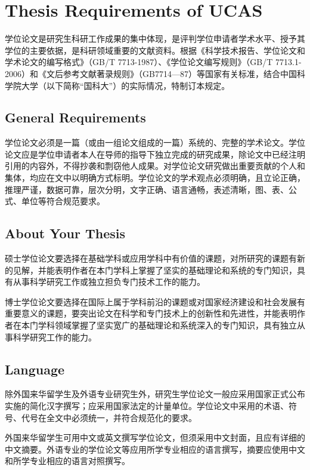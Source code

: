 
\chapter{Thesis Requirements of UCAS}
学位论文是研究生科研工作成果的集中体现，是评判学位申请者学术水平、授予其学位的主要依据，是科研领域重要的文献资料。根据《科学技术报告、学位论文和学术论文的编写格式》（GB/T 7713-1987）、《学位论文编写规则》（GB/T 7713.1-2006）和《文后参考文献著录规则》（GB7714—87）等国家有关标准，结合中国科学院大学（以下简称“国科大”）的实际情况，特制订本规定。

\section{General Requirements}

学位论文必须是一篇（或由一组论文组成的一篇）系统的、完整的学术论文。学位论文应是学位申请者本人在导师的指导下独立完成的研究成果，除论文中已经注明引用的内容外，不得抄袭和剽窃他人成果。对学位论文研究做出重要贡献的个人和集体，均应在文中以明确方式标明。学位论文的学术观点必须明确，且立论正确，推理严谨，数据可靠，层次分明，文字正确、语言通畅，表述清晰，图、表、公式、单位等符合规范要求。

\section{About Your Thesis}

硕士学位论文要选择在基础学科或应用学科中有价值的课题，对所研究的课题有新的见解，并能表明作者在本门学科上掌握了坚实的基础理论和系统的专门知识，具有从事科学研究工作或独立担负专门技术工作的能力。

博士学位论文要选择在国际上属于学科前沿的课题或对国家经济建设和社会发展有重要意义的课题，要突出论文在科学和专门技术上的创新性和先进性，并能表明作者在本门学科领域掌握了坚实宽广的基础理论和系统深入的专门知识，具有独立从事科学研究工作的能力。

\section{Language}

除外国来华留学生及外语专业研究生外，研究生学位论文一般应采用国家正式公布实施的简化汉字撰写；应采用国家法定的计量单位。学位论文中采用的术语、符号、代号在全文中必须统一，并符合规范化的要求。

外国来华留学生可用中文或英文撰写学位论文，但须采用中文封面，且应有详细的中文摘要。外语专业的学位论文等应用所学专业相应的语言撰写，摘要应使用中文和所学专业相应的语言对照撰写。


